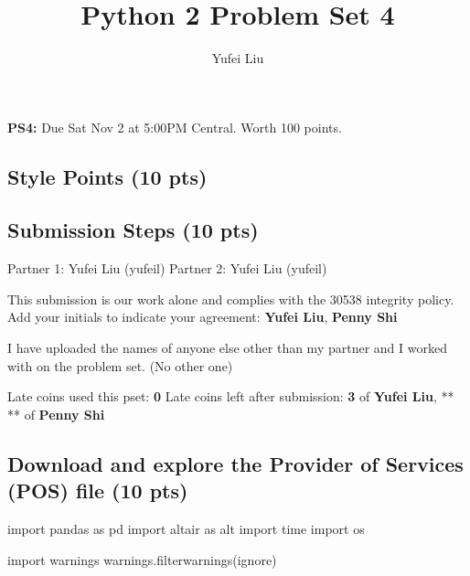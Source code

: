 \documentclass[
  letterpaper,
  DIV=11,
  numbers=noendperiod]{scrartcl}
\title{Python 2 Problem Set 4}
\author{Yufei Liu}
\date{}
\newenvironment{Shaded}{\begin{snugshade}}{\end{snugshade}}
\newcommand{\ImportTok}[1]{\textcolor[rgb]{0.00,0.46,0.62}{#1}}
\newcommand{\NormalTok}[1]{\textcolor[rgb]{0.00,0.23,0.31}{#1}}
\newcommand{\StringTok}[1]{\textcolor[rgb]{0.13,0.47,0.30}{#1}}
\begin{document}
\maketitle



\textbf{PS4:} Due Sat Nov 2 at 5:00PM Central. Worth 100 points.

\subsection{Style Points (10 pts)}\label{style-points-10-pts}

\subsection{Submission Steps (10 pts)}\label{submission-steps-10-pts}

Partner 1: Yufei Liu (yufeil) Partner 2: Yufei Liu (yufeil)

This submission is our work alone and complies with the 30538 integrity
policy. Add your initials to indicate your agreement: \textbf{Yufei
Liu}, \textbf{Penny Shi}

I have uploaded the names of anyone else other than my partner and I
worked with on the problem set. (No other one)

Late coins used this pset: \textbf{0} Late coins left after submission:
\textbf{3} of \textbf{Yufei Liu}, ** ** of \textbf{Penny Shi}

\subsection{Download and explore the Provider of Services (POS) file (10
pts)}\label{download-and-explore-the-provider-of-services-pos-file-10-pts}

\begin{Shaded}
\begin{Highlighting}[]
\ImportTok{import}\NormalTok{ pandas }\ImportTok{as}\NormalTok{ pd}
\ImportTok{import}\NormalTok{ altair }\ImportTok{as}\NormalTok{ alt}
\ImportTok{import}\NormalTok{ time}
\ImportTok{import}\NormalTok{ os}

\ImportTok{import}\NormalTok{ warnings }
\NormalTok{warnings.filterwarnings(}\StringTok{\textquotesingle{}ignore\textquotesingle{}}\NormalTok{)}
\end{Highlighting}
\end{Shaded}
\end{document}

